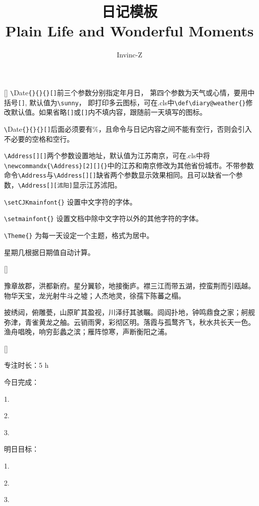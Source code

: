\documentclass{diary}
\title{日记模板 \\{\small Plain Life and Wonderful Moments}}
\author{Invinc-Z}
\begin{document}
\maketitle

\Address[中国][北京]
[\sun]%
\verb|\|Date\verb|{}{}{}[]|前三个参数分别指定年月日， 第四个参数为天气或心情，要用中括号\verb|[]|, 默认值为\verb|\sunny|， 即打印多云图标，可在.cls中\verb|\def\diary@weather{}|修改默认值。如果省略\verb|[]|或\verb|[]|内不填内容，跟随前一天填写的图标。

\verb|\|Date\verb|{}{}{}[]|后面必须要有\%，且命令与日记内容之间不能有空行，否则会引入不必要的空格和空行。

\verb|\Address[][]|两个参数设置地址，默认值为江苏南京，可在.cls中将
\verb|\newcommandx{\Address}[2][]{}|中的江苏和南京修改为其他省份城市。不带参数命令\verb|\Address|与\verb|\Address[][]|缺省两个参数显示效果相同。且可以缺省一个参数，\verb|\Address[][沭阳]|显示江苏沭阳。

\verb|\setCJKmainfont{}| 设置中文字符的字体。

\verb|\setmainfont{}| 设置文档中除中文字符以外的其他字符的字体。

\verb|\Theme{}| 为每一天设定一个主题，格式为居中。

星期几根据日期值自动计算。


\Address[][沭阳]
[]%
 \par
豫章故郡，洪都新府。星分翼轸，地接衡庐。襟三江而带五湖，控蛮荆而引瓯越。物华天宝，龙光射牛斗之墟；人杰地灵，徐孺下陈蕃之榻。

披绣闼，俯雕甍，山原旷其盈视，川泽纡其骇瞩。闾阎扑地，钟鸣鼎食之家；舸舰弥津，青雀黄龙之舳。云销雨霁，彩彻区明。落霞与孤鹜齐飞，秋水共长天一色。渔舟唱晚，响穷彭蠡之滨；雁阵惊寒，声断衡阳之浦。

\Address[][]
[\winkSmile]%
 \par
专注时长：5 h  \par
\quad \par
今日完成：\par
1.  \par
2.  \par
3.  \par
\quad \par
明日目标：\par
1. \par
2. \par
3. \par
\end{document}
